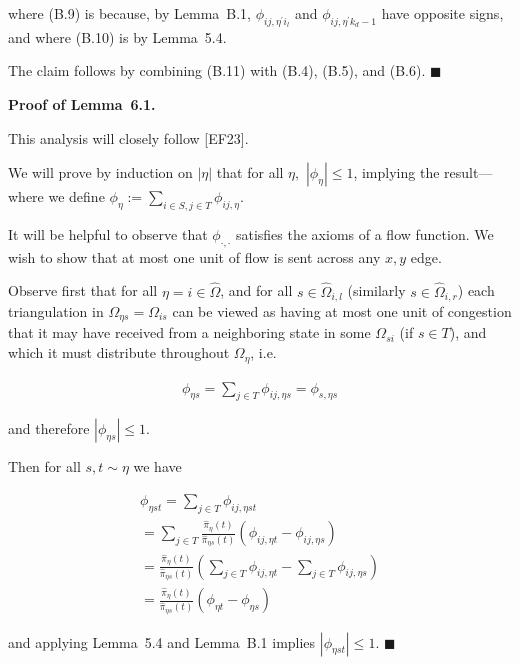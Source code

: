 where (B.9) is because, by Lemma B.1, $\phi_{ij,\eta^{\prime}i_{l}}$ and $\phi_{ij,\eta^{\prime}k_{d}-1}$ have opposite signs, and where (B.10) is by Lemma 5.4.\par




The claim follows by combining (B.11) with (B.4), (B.5), and (B.6).
\ensuremath{\blacksquare}\par





\par\medskip\noindent\textbf{Proof of Lemma 6.1.}\par



This analysis will closely follow [EF23].\par




We will prove by induction on $|\eta|$ that for all $\eta,$ $|\phi_{\eta}|\leq 1$, implying the result—where we define $\phi_{\eta}:=\sum_{i\in S,j\in T}\phi_{ij,\eta}$.\par




It will be helpful to observe that $\phi_{\cdot,\cdot}$ satisfies the axioms of a flow function. We wish to show that at most one unit of flow is sent across any $x,y$ edge.\par




Observe first that for all $\eta=i\in\hat{\Omega}$, and for all $s\in\hat{\Omega}_{i,l}$ (similarly $s\in\hat{\Omega}_{i,r}$) each triangulation in $\Omega_{\eta s}=\Omega_{is}$ can be viewed as having at most one unit of congestion that it may have received from a neighboring state in some $\Omega_{si}$ (if $s\in T$), and which it must distribute throughout $\Omega_{\eta}$, i.e.\par


\[\begin{gathered}
\phi_{\eta s}=\sum_{j\in T}\phi_{ij,\eta s}=\phi_{s,\eta s}
\end{gathered}\]


and therefore $|\phi_{\eta s}|\leq 1$.\par




Then for all $s,t\sim\eta$ we have\par


\[\begin{gathered}
\displaystyle\phi_{\eta st} \displaystyle=\sum_{j\in T}\phi_{ij,\eta st} \\
\displaystyle=\sum_{j\in T}\frac{\hat{\pi}_{\eta}(t)}{\hat{\pi}_{\eta s}(t)}(\phi_{ij,\eta t}-\phi_{ij,\eta s}) \\
\displaystyle=\frac{\hat{\pi}_{\eta}(t)}{\hat{\pi}_{\eta s}(t)}(\sum_{j\in T}\phi_{ij,\eta t}-\sum_{j\in T}\phi_{ij,\eta s}) \\
\displaystyle=\frac{\hat{\pi}_{\eta}(t)}{\hat{\pi}_{\eta s}(t)}(\phi_{\eta t}-\phi_{\eta s})
\end{gathered}\]


and applying Lemma 5.4 and Lemma B.1 implies $|\phi_{\eta st}|\leq 1$.
\ensuremath{\blacksquare}\par



